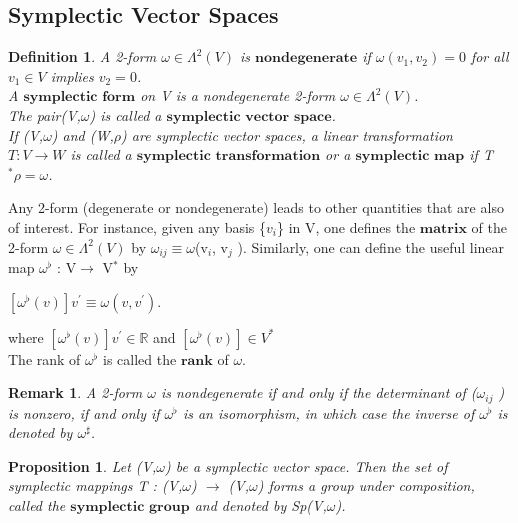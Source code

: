 \documentclass[12pt,a4paper]{article}
\newtheorem{rem}[thm]{Remark}
\newtheorem{defn}[thm]{Definition}
\newtheorem{prop}{Proposition}
\begin{document}
\subsection{Symplectic Vector Spaces}

\begin{defn}
A 2-form $\omega \in \Lambda^{2}(V)$ is $\textbf{nondegenerate}$ if $\omega(v_1, v_2) = 0$ for all $v_1 \in V$ implies $v_2 = 0$. \\A $\textbf{symplectic form}$ on V is a nondegenerate
2-form $\omega \in \Lambda^{2}(V)$. \\The pair(V,$\omega$) is called a $\textbf{symplectic vector space}$.\\
If (V,$\omega$) and (W,$\rho$) are symplectic vector spaces, a linear transformation $T:V \to W$ is called a $\textbf{symplectic transformation}$ or a $\textbf{symplectic map}$ if T$^* \rho = \omega$.
\end{defn}

Any 2-form (degenerate or nondegenerate) leads to other quantities that
are also of interest. For instance, given any basis \{$v_i$\} in V, one defines the
$\textbf{matrix}$ of the 2-form $\omega \in \Lambda^{2}(V)$ by $\omega_{ij} \equiv \omega$(v$_i$, v$_j$ ). Similarly, one can
define the useful linear map $\omega^{\flat}$ : V$\to$ V$^*$ by
\begin{center}
$ [ \omega^{\flat} (v) ] v^{'} \equiv \omega(v, v^{'})$.
\end{center}
\indent where $ [ \omega^{\flat} (v) ] v^{'} \in \mathbb{R}$ and  $ [ \omega^{\flat} (v) ] \in V^{*}$\\
The rank of $\omega^{\flat}$ is called the $\textbf{rank}$ of $\omega$.
\begin{rem}
A 2-form $\omega$ is nondegenerate if and only if the determinant of ($\omega_{ij}$ ) is nonzero, if and only if $\omega^{\flat}$ is an isomorphism, in which
case the inverse of $\omega^{\flat}$ is denoted by $\omega^{\sharp}$.
\end{rem}
\begin{prop}
Let (V,$\omega$) be a symplectic vector space. Then the set of
symplectic mappings T : (V,$\omega$) $\to$ (V,$\omega$) forms a group under composition,
called the $\textbf{symplectic group}$ and denoted by Sp(V,$\omega$).
\end{prop}
\end{document}
